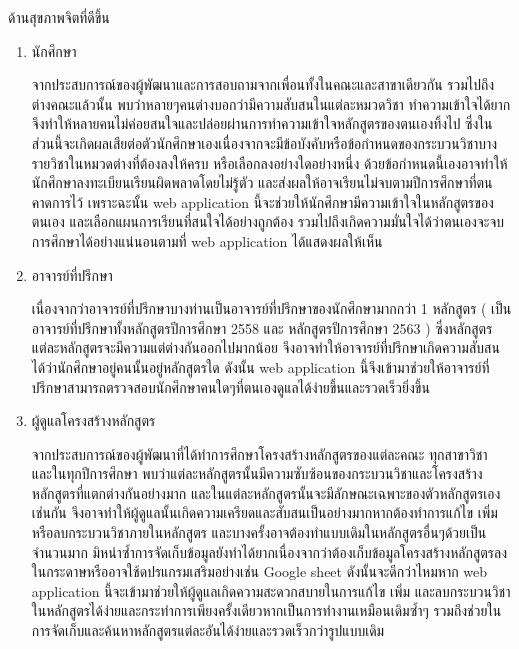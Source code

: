 ด้านสุขภาพจิตที่ดีขึ้น 

\begin{enumerate}
    \item นักศึกษา 
	
    จากประสบการณ์ของผู้พัฒนาและการสอบถามจากเพื่อนทั้งในคณะและสาขาเดียวกัน รวมไปถึงต่างคณะแล้วนั้น พบว่าหลายๆคนต่างบอกว่ามีความสับสนในแต่ละหมวดวิชา ทำความเข้าใจได้ยาก จึงทำให้หลายคนไม่ค่อยสนใจและปล่อยผ่านการทำความเข้าใจหลักสูตรของตนเองทิ้งไป  ซึ่งในส่วนนี้จะเกิดผลเสียต่อตัวนักศึกษาเองเนื่องจากจะมีข้อบังคับหรือข้อกำหนดของกระบวนวิชาบางรายวิชาในหมวดต่างที่ต้องลงให้ครบ หรือเลือกลงอย่างใดอย่างหนึ่ง ด้วยข้อกำหนดนี้เองอาจทำให้นักศึกษาลงทะเบียนเรียนผิดพลาดโดยไม่รู้ตัว และส่งผลให้อาจเรียนไม่จบตามปีการศึกษาที่ตนคาดการไว้ เพราะฉะนั้น web application นี้จะช่วยให้นักศึกษามีความเข้าใจในหลักสูตรของตนเอง และเลือกแผนการเรียนที่สนใจได้อย่างถูกต้อง รวมไปถึงเกิดความมั่นใจได้ว่าตนเองจะจบการศึกษาได้อย่างแน่นอนตามที่ web application ได้แสดงผลให้เห็น  

    
    \item อาจารย์ที่ปรึกษา 
	
    เนื่องจากว่าอาจารย์ที่ปรึกษาบางท่านเป็นอาจารย์ที่ปรึกษาของนักศึกษามากกว่า 1 หลักสูตร ( เป็นอาจารย์ที่ปรึกษาทั้งหลักสูตรปีการศึกษา 2558 และ หลักสูตรปีการศึกษา 2563 ) ซึ่งหลักสูตรแต่ละหลักสูตรจะมีความแต่ต่างกันออกไปมากน้อย จึงอาจทำให้อาจารย์ที่ปรึกษาเกิดความสับสนได้ว่านักศึกษาอยู่คนนั้นอยู่หลักสูตรใด ดังนั้น web application นี้จึงเข้ามาช่วยให้อาจารย์ที่ปรึกษาสามารถตรวจสอบนักศึกษาคนใดๆที่ตนเองดูแลได้ง่ายขึ้นและรวดเร็วยิ่งขึ้น

   
    \item ผู้ดูแลโครงสร้างหลักสูตร 
	
    จากประสบการณ์ของผู้พัฒนาที่ได้ทำการศึกษาโครงสร้างหลักสูตรของแต่ละคณะ ทุกสาขาวิชา และในทุกปีการศึกษา พบว่าแต่ละหลักสูตรนั้นมีความซับซ้อนของกระบวนวิชาและโครงสร้างหลักสูตรที่แตกต่างกันอย่างมาก และในแต่ละหลักสูตรนั้นจะมีลักษณะเฉพาะของตัวหลักสูตรเองเช่นกัน จึงอาจทำให้ผู้ดูแลนั้นเกิดความเครียดและสับสนเป็นอย่างมากหากต้องทำการแก้ไข เพิ่ม หรือลบกระบวนวิชาภายในหลักสูตร และบางครั้งอาจต้องทำแบบเดิมในหลักสูตรอื่นๆด้วยเป็นจำนวนมาก มิหนำซ้ำการจัดเก็บข้อมูลยังทำได้ยากเนื่องจากว่าต้องเก็บข้อมูลโครงสร้างหลักสูตรลงในกระดาษหรืออาจใช้ดปรแกรมเสริมอย่างเช่น Google sheet ดังนั้นจะดีกว่าไหมหาก web application นี้จะเข้ามาช่วยให้ผู้ดูแลเกิดความสะดวกสบายในการแก้ไข เพิ่ม และลบกระบวนวิชาในหลักสูตรได้ง่ายและกระทำการเพียงครั้งเดียวหากเป็นการทำงานเหมือนเดิมซ้ำๆ รวมถึงช่วยในการจัดเก็บและค้นหาหลักสูตรแต่ละอันได้ง่ายและรวดเร็วกว่ารูปแบบเดิม   
\end{enumerate}
